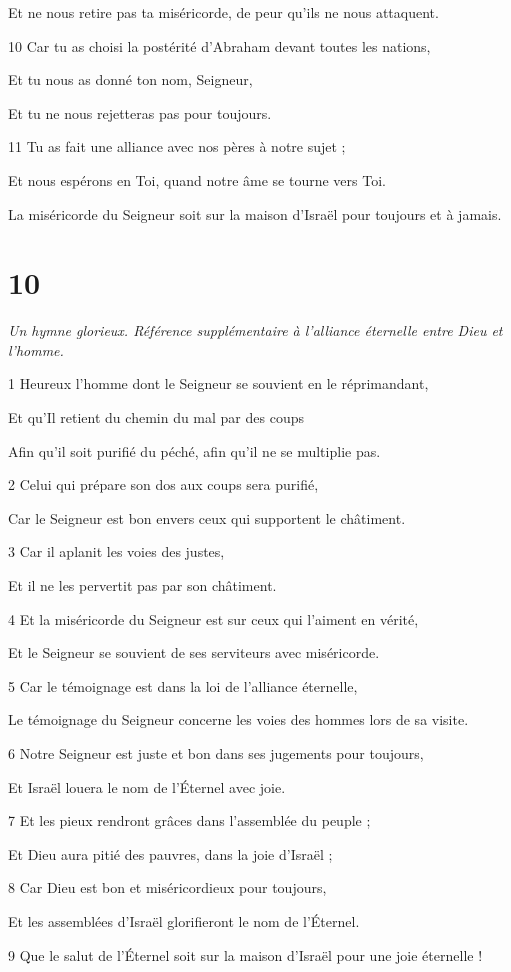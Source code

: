 \par     Et ne nous retire pas ta miséricorde, de peur qu’ils ne nous attaquent.
\par 10 Car tu as choisi la postérité d'Abraham devant toutes les nations,
\par     Et tu nous as donné ton nom, Seigneur,
\par     Et tu ne nous rejetteras pas pour toujours.
\par 11 Tu as fait une alliance avec nos pères à notre sujet ;
\par     Et nous espérons en Toi, quand notre âme se tourne vers Toi.
\par     La miséricorde du Seigneur soit sur la maison d'Israël pour toujours et à jamais.

\chapter{10}

\par \textit{Un hymne glorieux. Référence supplémentaire à l'alliance éternelle entre Dieu et l'homme.}

\par 1 Heureux l'homme dont le Seigneur se souvient en le réprimandant,
\par     Et qu'Il retient du chemin du mal par des coups
\par     Afin qu'il soit purifié du péché, afin qu'il ne se multiplie pas.
\par 2 Celui qui prépare son dos aux coups sera purifié,
\par     Car le Seigneur est bon envers ceux qui supportent le châtiment.
\par 3 Car il aplanit les voies des justes,
\par     Et il ne les pervertit pas par son châtiment.
\par 4 Et la miséricorde du Seigneur est sur ceux qui l'aiment en vérité,
\par     Et le Seigneur se souvient de ses serviteurs avec miséricorde.
\par 5 Car le témoignage est dans la loi de l'alliance éternelle,
\par     Le témoignage du Seigneur concerne les voies des hommes lors de sa visite.
\par 6 Notre Seigneur est juste et bon dans ses jugements pour toujours,
\par     Et Israël louera le nom de l'Éternel avec joie.
\par 7 Et les pieux rendront grâces dans l'assemblée du peuple ;
\par     Et Dieu aura pitié des pauvres, dans la joie d'Israël ;
\par 8 Car Dieu est bon et miséricordieux pour toujours,
\par     Et les assemblées d'Israël glorifieront le nom de l'Éternel.
\par   
\par 9 Que le salut de l'Éternel soit sur la maison d'Israël pour une joie éternelle !

